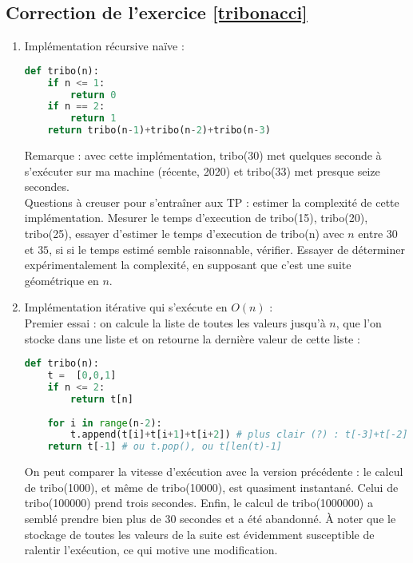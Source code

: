 \documentclass[11pt,a4paper]{article}
\begin{document}
\subsection*{Correction de l'exercice \ref{tribonacci}}
\begin{enumerate}
Remarque : en conditions de TP, les fonctions pourraient être testée et chronométrées avec :
\begin{lstlisting}[language=Python]
def test_tribo():
	assert tribo(3) == 1
	assert tribo(4) == 2
	assert tribo(5) == 4
	assert tribo(9) == 44
	print("Test : tout semble ok")
	
import time
def perf_tribo(n):
	start = time.perf_counter()
	t = tribo(n)
	end = time.perf_counter()
	delta = end - start
	return delta
\end{lstlisting}

\item Implémentation récursive naïve : 
\begin{lstlisting}[language=Python]
def tribo(n):
	if n <= 1:
		return 0
	if n == 2:
		return 1
	return tribo(n-1)+tribo(n-2)+tribo(n-3)
\end{lstlisting}
Remarque : avec cette implémentation, tribo(30) met quelques seconde à s'exécuter sur ma machine (récente, 2020) et tribo(33) met presque seize secondes.\\
Questions à creuser pour s'entraîner aux TP : estimer la complexité de cette implémentation. Mesurer le temps d'execution de tribo(15), tribo(20), tribo(25), essayer d'estimer le temps d'execution de tribo(n) avec $n$ entre $30$ et $35$, si si le temps estimé semble raisonnable, vérifier. Essayer de déterminer expérimentalement la complexité, en supposant que c'est une suite géométrique en $n$.
\item Implémentation itérative qui s'exécute en $O(n)$ :\\
Premier essai : on calcule la liste de toutes les valeurs jusqu'à $n$, que l'on stocke dans une liste et on retourne la dernière valeur de cette liste :
\begin{lstlisting}[language=Python]
def tribo(n):
	t =  [0,0,1]
	if n <= 2:
		return t[n]
		
	for i in range(n-2):
		t.append(t[i]+t[i+1]+t[i+2]) # plus clair (?) : t[-3]+t[-2]+t[-1]
	return t[-1] # ou t.pop(), ou t[len(t)-1]
\end{lstlisting}
On peut comparer la vitesse d'exécution avec la version précédente : le calcul de tribo(1000), et même de tribo(10000), est quasiment instantané. Celui de tribo(100000) prend trois secondes. Enfin, le calcul de tribo(1000000) a semblé prendre bien plus de 30 secondes et a été abandonné. 
À noter que le stockage de toutes les valeurs de la suite est évidemment susceptible de ralentir l'exécution, ce qui motive une modification.


\end{enumerate}
\end{document}
